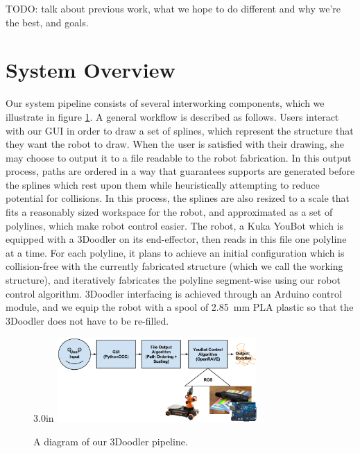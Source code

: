 \documentclass[conference]{acmsiggraph}
\begin{document}


TODO: talk about previous work, what we hope to do different and why we're the best, and goals.


\section{System Overview}
Our system pipeline consists of several interworking components, which we illustrate in figure \ref{fig:systemarchitecture}.  A general workflow is described as follows.  Users interact with our GUI in order to draw a set of splines, which represent the structure that they want the robot to draw.  When the user is satisfied with their drawing, she may choose to output it to a file readable to the robot fabrication.  In this output process, paths are ordered in a way that guarantees supports are generated before the splines which rest upon them while heuristically attempting to reduce potential for collisions.  In this process, the splines are also resized to a scale that fits a reasonably sized workspace for the robot, and approximated as a set of polylines, which make robot control easier.  The robot, a Kuka YouBot which is equipped with a 3Doodler on its end-effector, then reads in this file one polyline at a time.  For each polyline, it plans to achieve an initial configuration which is collision-free with the currently fabricated structure (which we call the working structure), and iteratively fabricates the polyline segment-wise using our robot control algorithm.  3Doodler interfacing is achieved through an Arduino control module, and we equip the robot with a spool of 2.85~mm PLA plastic so that the 3Doodler does not have to be re-filled.

\begin{figure}[t]{3.0in}
\centering
\includegraphics[width=3.0in]{images/system_arch.png}
\caption{A diagram of our 3Doodler pipeline.}
\label{fig:systemarchitecture}
\end{figure}
\end{document}
